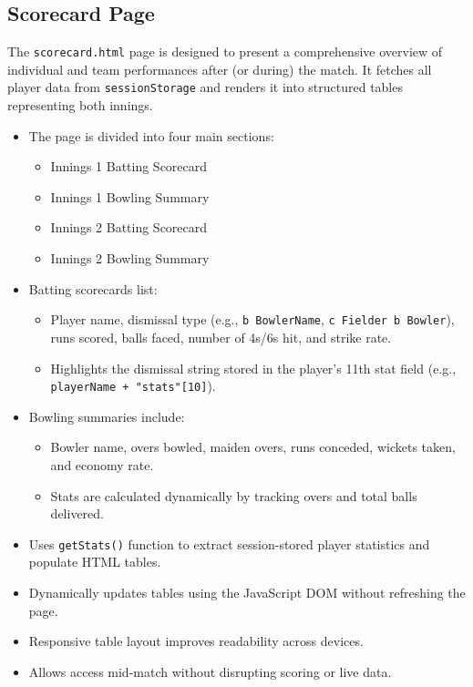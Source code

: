 \documentclass[a4paper,10pt]{article}
\begin{document}
\subsection{Scorecard Page}

The \texttt{scorecard.html} page is designed to present a comprehensive overview of individual and team performances after (or during) the match. It fetches all player data from \texttt{sessionStorage} and renders it into structured tables representing both innings.

\begin{itemize}
    \item The page is divided into four main sections:
    \begin{itemize}
        \item Innings 1 Batting Scorecard
        \item Innings 1 Bowling Summary
        \item Innings 2 Batting Scorecard
        \item Innings 2 Bowling Summary
    \end{itemize}
    \item Batting scorecards list:
    \begin{itemize}
        \item Player name, dismissal type (e.g., \texttt{b BowlerName}, \texttt{c Fielder b Bowler}), runs scored, balls faced, number of 4s/6s hit, and strike rate.
        \item Highlights the dismissal string stored in the player’s 11th stat field (e.g., \texttt{playerName + "stats"[10]}).
    \end{itemize}
    \item Bowling summaries include:
    \begin{itemize}
        \item Bowler name, overs bowled, maiden overs, runs conceded, wickets taken, and economy rate.
        \item Stats are calculated dynamically by tracking overs and total balls delivered.
    \end{itemize}
    \item Uses \texttt{getStats()} function to extract session-stored player statistics and populate HTML tables.
    \item Dynamically updates tables using the JavaScript DOM without refreshing the page.
    \item Responsive table layout improves readability across devices.
    \item Allows access mid-match without disrupting scoring or live data.
\end{itemize}
\end{document}
